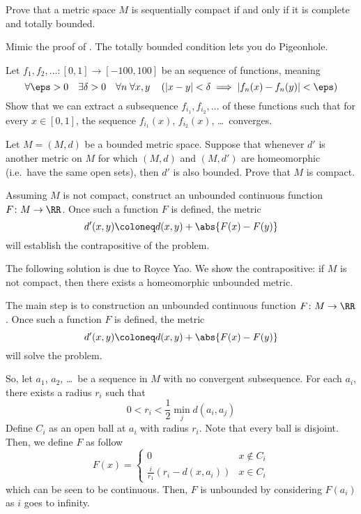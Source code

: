 \begin{dproblem}
	\gim
	Prove that a metric space $M$ is sequentially compact
	if and only if it is complete and totally bounded.
	\label{thm:bzw}
	\begin{hint}
		Mimic the proof of .
		The totally bounded condition lets you do Pigeonhole.
	\end{hint}
\end{dproblem}

\begin{problem}
	\gim
	Let
	$f_1, f_2, \ldots \colon [0,1] \to [-100,100]$
	be an  sequence of functions, meaning
	\[
		\forall \eps > 0 \quad
		\exists \delta > 0 \quad
		\forall n \;
		\forall x,y \quad
		\left( \left\lvert x-y \right\rvert <\delta
		\implies \left\lvert f_n(x) - f_n(y) \right\rvert < \eps \right)
	\]
	Show that we can extract a subsequence $f_{i_1}, f_{i_2}, \dots$
	of these functions such that for every $x \in [0,1]$,
	the sequence $f_{i_1}(x)$, $f_{i_2}(x)$, \dots\ converges.
\end{problem}

\begin{problem}
	\gim
	Let $M = (M,d)$ be a bounded metric space.
	Suppose that whenever $d'$ is another metric on $M$
	for which $(M,d)$ and $(M,d')$ are homeomorphic
	(i.e.\ have the same open sets), then $d'$ is also bounded.
	Prove that $M$ is compact.
	\begin{hint}
		Assuming $M$ is not compact, construct an
		unbounded continuous function $F \colon M \to \RR$.
		Once such a function $F$ is defined, the metric
		\[ d'(x, y) \coloneq d(x, y) + \abs{F(x) - F(y)} \]
		will establish the contrapositive of the problem.
	\end{hint}

	\begin{sol}
		The following solution is due to Royce Yao.
		We show the contrapositive:
		if $M$ is not compact, then there exists a homeomorphic unbounded metric.

		The main step is to construction
		an unbounded continuous function $F \colon M \to \RR$.
		Once such a function $F$ is defined, the metric
		\[ d'(x, y) \coloneq d(x, y) + \abs{F(x) - F(y)} \]
		will solve the problem.

		So, let $a_1$, $a_2$, \dots\ be a sequence in $M$
		with no convergent subsequence.
		For each $a_i$, there exists a radius $r_i$ such that
		\[ 0 < r_i < \frac{1}{2} \min_{j} d(a_i, a_j) \]
		Define $C_i$ as an open ball at $a_i$ with radius $r_i$.
		Note that every ball is disjoint.
		Then, we define $F$ as follow
		\[
			F(x) = \begin{cases}
				0 & x \not\in C_i \\
				\frac{i}{r_1}(r_i - d(x, a_i)) & x \in C_i
			\end{cases}
		\]
		which can be seen to be continuous.
		Then, $F$ is unbounded by considering $F(a_i)$ as $i$ goes to infinity.
	\end{sol}
\end{problem}

